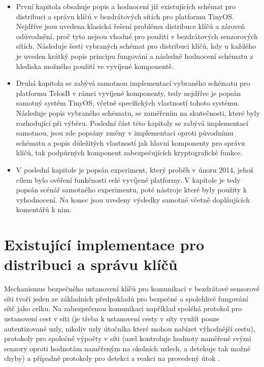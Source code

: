 \documentclass[11pt,final,twoside]{fithesis2}
\begin{document}
\begin {itemize}
\item První kapitola obsahuje popis a hodnocení již existujících schémat pro distribuci a správu klíčů v bezdrátových sítích pro platformu TinyOS. Nejdříve jsou uvedena klasická řešení problému distribuce klíčů 
a zároveň odůvodnění, proč tyto nejsou vhodné pro použití v bezdrátových senzorových sítích. Následuje šesti vybraných schémat pro distribuci klíčů, kdy u každého je uveden krátký popis principu fungování
a následně hodnocení schématu z hlediska možného použití ve vyvíjené komponentě. 

\item Druhá kapitola se zabývá samotnou implementací vybraného schématu pro platformu TelosB v rámci vyvíjené komponenty, tedy nejdříve je popsán samotný systém TinyOS, včetně specifických vlastností tohoto 
systému. Následuje popis vybraného schématu, se zaměřením na skutečnosti, které byly rozhodující při výběru. Poslední část této kapitoly se zabývá implementací samotnou, jsou zde popsány změny v implementaci 
oproti původnímu schématu a popis důležitých vlastností jak hlavní komponenty pro správu klíčů, tak podpůrných komponent zabezpečujících kryptografické funkce. 

\item V poslední kapitole je popsán experiment, který proběh v únoru 2014, jehož cílem bylo ověření funkčnosti celé vyvíjené platformy. V kapitole je tedy popsán scénář samotného experimentu, poté nástroje které 
byly použity k vyhodnocení. Na konec jsou uvedeny výsledky samotné včetně doplňujících komentářů k nim. 
\end{itemize}



\chapter{Existující implementace pro distribuci a správu klíčů}
Mechanismus bezpečného ustanovení klíčů pro komunikaci v bezdrátové sensorové síti tvoří jeden ze základních předpokladů 
pro bezpečné a spolehlivé fungování sítě jako celku. Na zabezpečenou komunikaci například spoléhá protokol pro ustanovení cest v síti (je třeba k ustanovení cesty v síty využít
pouze autentizované uzly, nikoliv uzly útočníka které mohou nabízet výhodnější cestu), protokoly pro společné výpočty v síti (uzel kontroluje hodnoty naměřené svými senzory oproti
hodnotám naměřeným na okolních uzlech, a detekuje tak možné chyby) a případně protokoly pro detekci a reakci na provedený útok \cite{Alcaraz2012}.
\end{document}
